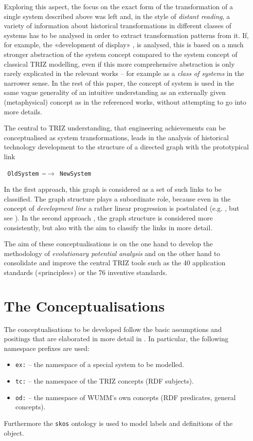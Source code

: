\documentclass[11pt,a4paper]{article}
\begin{document}
Exploring this aspect, the focus on the exact form of the transformation of a
single system described above was left and, in the style of \emph{distant
  reading}, a variety of information about historical transformations in
different classes of systems has to be analysed in order to extract
transformation patterns from it.  If, for example, the «development of
display» \cite[p. 22]{TESE2018}, \cite[ch. 5]{Shpakovsky2016} is analysed,
this is based on a much stronger abstraction of the system concept compared to
the system concept of classical TRIZ modelling, even if this more
comprehensive abstraction is only rarely explicated in the relevant works --
for example as a \emph{class of systems} in the narrower sense. In the rest of
this paper, the concept of system is used in the same vague generality of an
intuitive understanding as an externally given (metaphysical) concept as in
the referenced works, without attempting to go into more details.

The central to TRIZ understanding, that engineering achievements can be
conceptualised as system transformations, leads in the analysis of historical
technology development to the structure of a directed graph with the
prototypical link
\begin{center}\tt
  OldSystem \textrm{---}$\to$ NewSystem
\end{center}
In the first approach, this graph is considered as a set of such links to be
classified. The graph structure plays a subordinate role, because even in the
concept of \emph{development line} a rather linear progression is postulated
(e.g. \cite[Figure 4.104]{KS}, but see \cite[4.8.4 and Figure 4.72]{KS}). In
the second approach \cite{Shpakovsky2016}, the graph structure is considered
more consistently, but also with the aim to classify the links in more detail.

The aim of these conceptualisations is on the one hand to develop the
methodology of \emph{evolutionary potential analysis} \cite[4.8.7]{KS} and on
the other hand to consolidate and improve the central TRIZ tools such as the
40 application standards («principles») or the 76 inventive standards.

\section{The Conceptualisations}

The conceptualisations to be developed follow the basic assumptions and
positings that are elaborated in more detail in \cite{Graebe2021}. In
particular, the following namespace prefixes are used:
\begin{itemize}[noitemsep]
\item \texttt{ex:} -- the namespace of a special system to be modelled. 
\item \texttt{tc:} -- the namespace of the TRIZ concepts (RDF subjects).
\item \texttt{od:} -- the namespace of WUMM's own concepts (RDF predicates,
  general concepts). 
\end{itemize}
Furthermore the \texttt{skos} ontology is used to model labels and definitions of the object.
\end{document}

